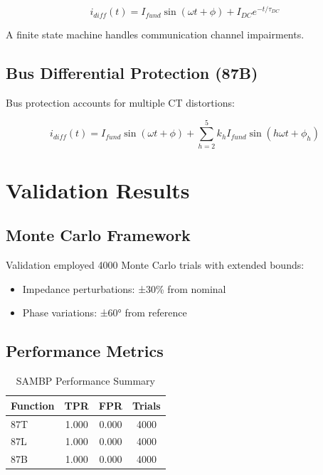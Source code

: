 \documentclass[10pt]{article}
\begin{document}
\begin{equation}
i_{diff}(t) = I_{fund} \sin(\omega t + \phi) + I_{DC} e^{-t/\tau_{DC}}
\label{eq:87l}
\end{equation}

A finite state machine handles communication channel impairments.

\subsection{Bus Differential Protection (87B)}

Bus protection accounts for multiple CT distortions:

\begin{equation}
i_{diff}(t) = I_{fund} \sin(\omega t + \phi) + \sum_{h=2}^5 k_h I_{fund} \sin(h\omega t + \phi_h)
\label{eq:87b}
\end{equation}

\section{Validation Results}
\label{sec:results}

\subsection{Monte Carlo Framework}

Validation employed 4000 Monte Carlo trials with extended bounds:
\begin{itemize}
\item Impedance perturbations: ±30\% from nominal
\item Phase variations: ±60° from reference
\end{itemize}

\subsection{Performance Metrics}

\begin{table}[!t]
\caption{SAMBP Performance Summary}
\label{tab:performance}
\centering
\begin{tabular}{@{}lccc@{}}
\toprule
Function & TPR & FPR & Trials \\
\midrule
87T & 1.000 & 0.000 & 4000 \\
87L & 1.000 & 0.000 & 4000 \\
87B & 1.000 & 0.000 & 4000 \\
\bottomrule
\end{tabular}
\end{table}
\end{document}
